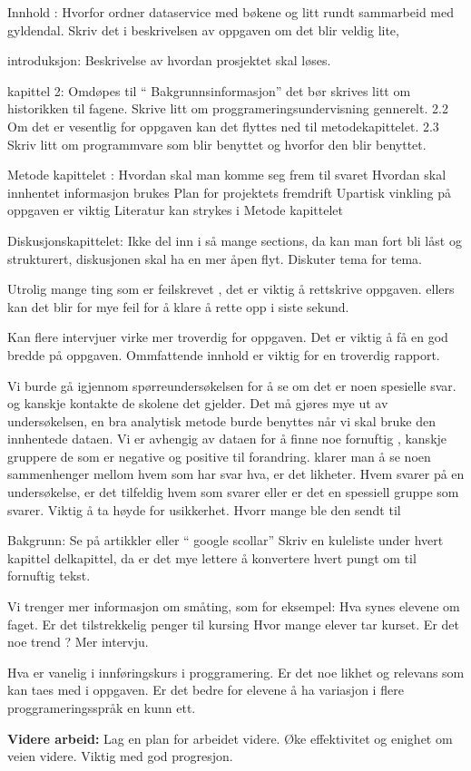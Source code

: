 Innhold : Hvorfor ordner dataservice med bøkene og litt rundt sammarbeid med gyldendal. Skriv det i beskrivelsen av oppgaven om det blir veldig lite,

introduksjon: Beskrivelse av hvordan prosjektet skal løses.

kapittel 2: Omdøpes til “ Bakgrunnsinformasjon”  det bør skrives litt om historikken til fagene.
	      Skrive litt om proggrameringsundervisning gennerelt. 
      2.2 Om det er vesentlig for oppgaven kan det flyttes ned til metodekapittelet.
      2.3 Skriv litt om programmvare som blir benyttet og hvorfor den blir benyttet.

Metode kapittelet : Hvordan skal man komme seg frem til svaret
		 Hvordan skal innhentet informasjon brukes
 Plan for projektets fremdrift
 Upartisk vinkling på oppgaven er viktig
Literatur kan strykes i Metode kapittelet

Diskusjonskapittelet: Ikke del inn i så mange sections, da kan man fort bli låst og strukturert, diskusjonen skal ha en mer åpen flyt. Diskuter tema for tema.

Utrolig mange ting som er feilskrevet , det er viktig å rettskrive oppgaven. ellers kan det blir for mye feil for å klare å rette opp i siste sekund.

Kan flere intervjuer virke mer troverdig for oppgaven. Det er viktig å få en god bredde på oppgaven. Ommfattende innhold er viktig for en troverdig rapport.

Vi burde gå igjennom spørreundersøkelsen for å se om det er noen spesielle svar. og kanskje kontakte de skolene det gjelder.
Det må gjøres mye ut av undersøkelsen, en bra analytisk metode burde benyttes når vi skal bruke den innhentede dataen.
Vi er avhengig av dataen for å finne noe fornuftig , kanskje gruppere de som er negative og positive til forandring. klarer man å se noen sammenhenger mellom hvem som har svar hva, er det likheter.
Hvem svarer på en undersøkelse, er det tilfeldig hvem som svarer eller er det en spessiell gruppe som svarer. Viktig å ta høyde for usikkerhet.
Hvorr mange ble den sendt til


Bakgrunn: Se på artikkler eller “ google scollar”
Skriv en kuleliste under hvert kapittel delkapittel, da er det mye lettere å konvertere hvert pungt om til fornuftig tekst.

Vi trenger mer informasjon om småting, som for eksempel:
	Hva synes elevene om faget.
	Er det tilstrekkelig penger til kursing 
	Hvor mange elever tar kurset. Er det noe trend ?
	Mer intervju.

Hva er vanelig i innføringskurs i proggramering. Er det noe likhet og relevans som kan taes med i oppgaven. Er det bedre for elevene å ha variasjon i flere proggrameringsspråk en kunn ett. \newline



\hspace{-17pt}\textbf{Videre arbeid:}\newline
Lag en plan for arbeidet videre.\newline
Øke effektivitet og enighet om veien videre.\newline
Viktig med god progresjon.


\newpage

